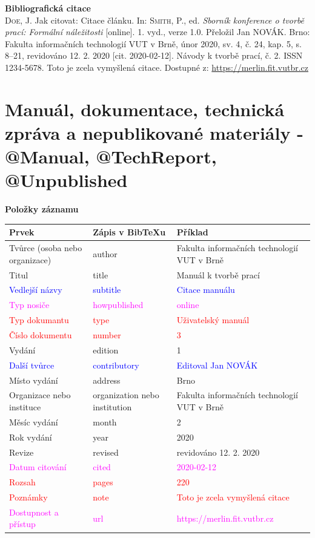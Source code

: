 \bigskip

\noindent \textbf{Bibliografická citace}\\
\textsc{Doe}, J. Jak citovat: Citace článku.
In: \textsc{Smith}, P., ed. \textit{Sborník konference o tvorbě prací: Formální náležitosti} [online]. 1. vyd., verze 1.0. Přeložil Jan NOVÁK. Brno: Fakulta informačních technologií VUT v Brně, únor 2020, sv. 4, č. 24, kap. 5, s. 8–21, revidováno 12. 2. 2020 [cit. 2020-02-12]. Návody k tvorbě prací, č. 2. ISSN 1234-5678. Toto je zcela vymyšlená citace. Dostupné z: \url{https://merlin.fit.vutbr.cz}
\newpage
\section*{Manuál, dokumentace, technická zpráva a nepublikované materiály - @Manual, @TechReport, @Unpublished}
\label{pr-manual}
\noindent \textbf{Položky záznamu}

\medskip

\begin{tabularx}{\linewidth}{X X X}
    Prvek & Zápis v BibTeXu & Příklad\\\hline
    Tvůrce (osoba nebo organizace) & author & Fakulta informačních technologií VUT v Brně\\
    Titul & title & Manuál k tvorbě prací\\
    \textcolor{blue}{Vedlejší názvy} & \textcolor{blue}{subtitle} & \textcolor{blue}{Citace manuálu}\\
    \textcolor{magenta}{Typ nosiče} & \textcolor{magenta}{howpublished} & \textcolor{magenta}{online}\\
    \textcolor{red}{Typ dokumantu} & \textcolor{red}{type} & \textcolor{red}{Uživatelský manuál}\\
    \textcolor{red}{Číslo dokumentu} & \textcolor{red}{number} & \textcolor{red}{3}\\
    Vydání & edition & 1\\
    \textcolor{blue}{Další tvůrce} & \textcolor{blue}{contributory} & \textcolor{blue}{Editoval Jan NOVÁK}\\
    Místo vydání & address & Brno\\
    Organizace nebo instituce & organization nebo institution & Fakulta informačních technologií VUT v Brně\\
    Měsíc vydání & month & 2\\
    Rok vydání & year & 2020\\
    Revize & revised & revidováno 12. 2. 2020\\
    \textcolor{magenta}{Datum citování} & \textcolor{magenta}{cited} & \textcolor{magenta}{2020-02-12}\\
    \textcolor{red}{Rozsah} & \textcolor{red}{pages} & \textcolor{red}{220}\\   
    \textcolor{red}{Poznámky} & \textcolor{red}{note} & \textcolor{red}{Toto je zcela vymyšlená citace}\\
    \textcolor{magenta}{Dostupnost a přístup} & \textcolor{magenta}{url} & \textcolor{magenta}{https://merlin.fit.vutbr.cz}\\
\end{tabularx}

